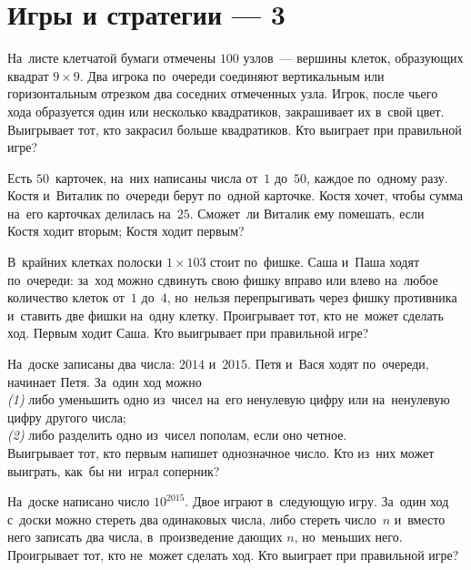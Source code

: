 
\section*{Игры и стратегии --- 3}


\begin{problems}

\item
На~листе клетчатой бумаги отмечены $100$ узлов~--- вершины клеток, образующих
квадрат $9 \times 9$.
Два игрока по~очереди соединяют вертикальным или горизонтальным отрезком два
соседних отмеченных узла.
Игрок, после чьего хода образуется один или несколько квадратиков, закрашивает
их в~свой цвет.
Выигрывает тот, кто закрасил больше квадратиков.
Кто выиграет при правильной игре?

\item
Есть $50$~карточек, на~них написаны числа от~$1$ до~$50$, каждое по~одному
разу.
Костя и~Виталик по~очереди берут по~одной карточке.
Костя хочет, чтобы сумма на~его карточках делилась на~$25$.
Сможет~ли Виталик ему помешать,
если
\\
\subproblem Костя ходит вторым;
\qquad
\subproblem Костя ходит первым?

\item
В~крайних клетках полоски $1 \times 103$ стоит по~фишке.
Саша и~Паша ходят по~очереди: за~ход можно сдвинуть свою фишку вправо или влево
на~любое количество клеток от~$1$ до~$4$, но~нельзя перепрыгивать через фишку
противника и~ставить две фишки на~одну клетку.
Проигрывает тот, кто не~может сделать ход.
Первым ходит Саша.
Кто выигрывает при правильной игре?

\item
На~доске записаны два числа: $2014$ и~$2015$.
Петя и~Вася ходят по~очереди, начинает Петя.
За~один ход можно
\\
\textit{(1)}
либо уменьшить одно из~чисел на~его ненулевую цифру или на~ненулевую цифру
другого числа;
\\
\textit{(2)}
либо разделить одно из~чисел пополам, если оно четное.
\\
Выигрывает тот, кто первым напишет однозначное число.
Кто из~них может выиграть, как~бы ни~играл соперник?

\item
На~доске написано число $10^{2015}$.
Двое играют в~следующую игру.
За~один ход с~доски можно стереть два одинаковых числа, либо стереть число~$n$
и~вместо него записать два числа, в~произведение дающих $n$, но~меньших него.
Проигрывает тот, кто не~может сделать ход.
Кто выиграет при правильной игре?


\end{problems}

